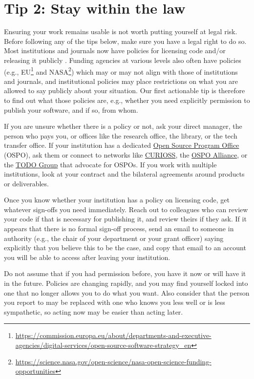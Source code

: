 \documentclass[10pt,letterpaper]{article}
\begin{document}
\section*{Tip 2: Stay within the law}

Ensuring your work remains usable is not worth putting yourself at legal risk.
Before following any of the tips below,
make sure you have a legal right to do so.
Most institutions and journals now have policies for licensing code and/or releasing it publicly \cite{Katz2018,Ham2019}.
Funding agencies at various levels also often have policies
(e.g.,
EU\footnote{\url{https://commission.europa.eu/about/departments-and-executive-agencies/digital-services/open-source-software-strategy_en}}
and NASA\footnote{\url{https://science.nasa.gov/open-science/nasa-open-science-funding-opportunities}})
which may or may not align with those of institutions and journals,
and institutional policies may place restrictions on what you are allowed to say publicly about your situation.
Our first actionable tip is therefore to find out what those policies are,
e.g.,
whether you need explicitly permission to publish your software,
and if so,
from whom.

If you are unsure whether there is a policy or not,
ask your direct manager,
the person who pays you,
or offices like the research office,
the library,
or the tech transfer office.
If your institution has a dedicated
\href{https://sustainoss.org/academic-map/universities/index.html}{Open Source Program Office} (OSPO),
ask them
or connect to networks like \href{https://curioss.org}{CURIOSS},
the \href{https://ospo-alliance.org/}{OSPO Alliance},
or the \href{https://todogroup.org/}{TODO Group}
that advocate for OSPOs.
If you work with multiple institutions,
look at your contract and the bilateral agreements around products or deliverables.

Once you know whether your institution has a policy on licensing code,
get whatever sign-offs you need immediately.
Reach out to colleagues who can review your code if that is necessary for publishing it,
and review theirs if they ask.
If it appears that there is no formal sign-off process,
send an email to someone in authority
(e.g., the chair of your department or your grant officer)
saying explicitly that you believe this to be the case,
and copy that email to an account you will be able to access
after leaving your institution.

Do not assume that if you had permission before,
you have it now or will have it in the future.
Policies are changing rapidly,
and you may find yourself locked into one that no longer allows you to do what you want.
Also consider that the person you report to may be replaced with one who knows you less well or is less sympathetic,
so acting now may be easier than acting later.
\end{document}
